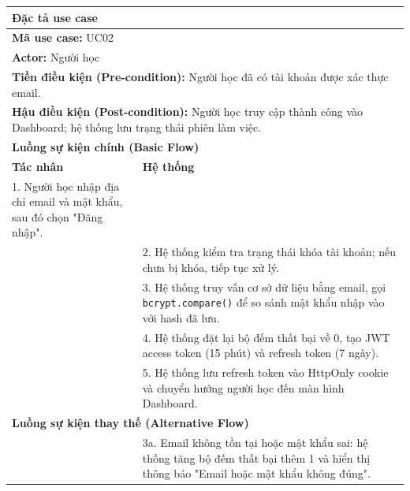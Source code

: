 \documentclass[a4paper,12pt]{extreport}
\begin{document}
\begin{table}[!ht]
    \centering
    \renewcommand{\arraystretch}{1.1}
    \begin{tabularx}{\linewidth}{|X|X|}
        \hline
        \multicolumn{2}{|l|}{\textbf{Đặc tả use case}} \\ \hline
        \multicolumn{2}{|l|}{\textbf{Mã use case:} UC02} \\ \hline
        \multicolumn{2}{|l|}{\textbf{Actor:} Người học} \\ \hline
        \multicolumn{2}{|p{\dimexpr\linewidth-2\tabcolsep-2\arrayrulewidth}|}{\textbf{Tiền điều kiện (Pre-condition):} Người học đã có tài khoản được xác thực email.} \\ \hline
        \multicolumn{2}{|p{\dimexpr\linewidth-2\tabcolsep-2\arrayrulewidth}|}{\textbf{Hậu điều kiện (Post-condition):} Người học truy cập thành công vào Dashboard; hệ thống lưu trạng thái phiên làm việc.} \\ \hline
        \multicolumn{2}{|l|}{\textbf{Luồng sự kiện chính (Basic Flow)}} \\ \hline
        \textbf{Tác nhân} & \textbf{Hệ thống} \\ \hline

        1. Người học nhập địa chỉ email và mật khẩu, sau đó chọn "Đăng nhập". & \\ \hline

        & 2. Hệ thống kiểm tra trạng thái khóa tài khoản; nếu chưa bị khóa, tiếp tục xử lý. \\ \hline

        & 3. Hệ thống truy vấn cơ sở dữ liệu bằng email, gọi \texttt{bcrypt.compare()} để so sánh mật khẩu nhập vào với hash đã lưu. \\ \hline

        & 4. Hệ thống đặt lại bộ đếm thất bại về 0, tạo JWT access token (15 phút) và refresh token (7 ngày). \\ \hline

        & 5. Hệ thống lưu refresh token vào HttpOnly cookie và chuyển hướng người học đến màn hình Dashboard. \\ \hline

        \multicolumn{2}{|l|}{\textbf{Luồng sự kiện thay thế (Alternative Flow)}} \\ \hline

        & 3a. Email không tồn tại hoặc mật khẩu sai: hệ thống tăng bộ đếm thất bại thêm 1 và hiển thị thông báo "Email hoặc mật khẩu không đúng". \\ \hline


\end{tabularx}
\end{table}
\end{document}

